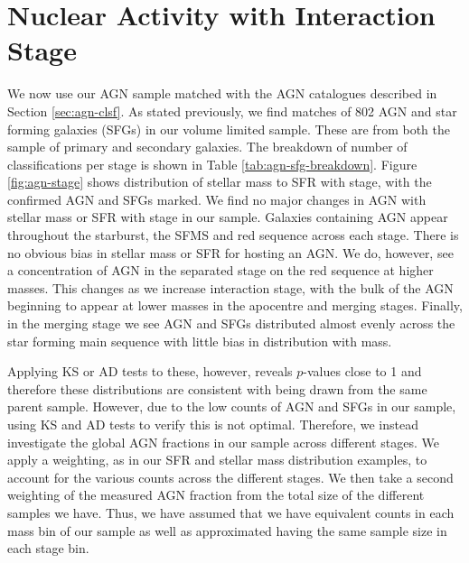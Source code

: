 \section{Nuclear Activity with Interaction Stage}\label{results:AGN_stage}
\noindent We now use our AGN sample matched with the AGN catalogues described in Section \ref{sec:agn-clsf}. As stated previously, we find matches of 802 AGN and star forming galaxies (SFGs) in our volume limited sample. These are from both the sample of primary and secondary galaxies. The breakdown of number of classifications per stage is shown in Table \ref{tab:agn-sfg-breakdown}. Figure \ref{fig:agn-stage} shows distribution of stellar mass to SFR with stage, with the confirmed AGN and SFGs marked. We find no major changes in AGN with stellar mass or SFR with stage in our sample. Galaxies containing AGN appear throughout the starburst, the SFMS and red sequence across each stage. There is no obvious bias in stellar mass or SFR for hosting an AGN. We do, however, see a concentration of AGN in the separated stage on the red sequence at higher masses. This changes as we increase interaction stage, with the bulk of the AGN beginning to appear at lower masses in the apocentre and merging stages. Finally, in the merging stage we see AGN and SFGs distributed almost evenly across the star forming main sequence with little bias in distribution with mass.

Applying KS or AD tests to these, however, reveals $p$-values close to 1 and therefore these distributions are consistent with being drawn from the same parent sample. However, due to the low counts of AGN and SFGs in our sample, using KS and AD tests to verify this is not optimal. Therefore, we instead investigate the global AGN fractions in our sample across different stages. We apply a weighting, as in our SFR and stellar mass distribution examples, to account for the various counts across the different stages. We then take a second weighting of the measured AGN fraction from the total size of the different samples we have. Thus, we have assumed that we have equivalent counts in each mass bin of our sample as well as approximated having the same sample size in each stage bin.


